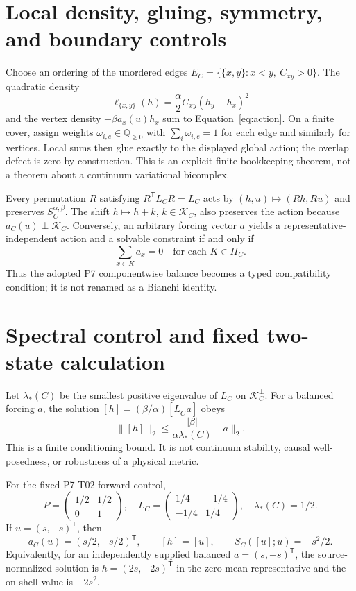 \documentclass[11pt]{article}
\newcommand{\Q}{\mathbb Q}
\newcommand{\Kspace}{\mathcal K_C}
\newcommand{\Sclosure}{S_C}
\begin{document}
\section{Local density, gluing, symmetry, and boundary controls}

Choose an ordering of the unordered edges
\(E_C=\{\{x,y\}:x<y,\ C_{xy}>0\}\).  The quadratic density
\[
  \ell_{\{x,y\}}(h)=\frac{\alpha}{2}C_{xy}(h_y-h_x)^2
\]
and the vertex density \(-\beta a_x(u)h_x\) sum to
Equation~\eqref{eq:action}.  On a finite cover, assign weights
\(\omega_{i,e}\in\Q_{\geq0}\) with \(\sum_i\omega_{i,e}=1\) for each edge
and similarly for vertices.  Local sums then glue exactly to the displayed
global action; the overlap defect is zero by construction.  This is an
explicit finite bookkeeping theorem, not a theorem about a continuum
variational bicomplex.

Every permutation \(R\) satisfying \(R^{\mathsf T}L_CR=L_C\) acts by
\((h,u)\mapsto(Rh,Ru)\) and preserves \(\Sclosure^{\alpha,\beta}\).
The shift \(h\mapsto h+k\), \(k\in\Kspace\), also preserves the action
because \(a_C(u)\perp\Kspace\).  Conversely, an arbitrary forcing vector
\(a\) yields a representative-independent action and a solvable constraint
if and only if
\[
  \sum_{x\in K}a_x=0
  \quad\text{for each }K\in\Pi_C.
\]
Thus the adopted P7 componentwise balance becomes a typed compatibility
condition; it is not renamed as a Bianchi identity.

\section{Spectral control and fixed two-state calculation}

Let \(\lambda_*(C)\) be the smallest positive eigenvalue of \(L_C\) on
\(\Kspace^\perp\).  For a balanced forcing \(a\), the solution
\([h]=(\beta/\alpha)[L_C^+a]\) obeys
\begin{equation}
 \|[h]\|_2
 \leq
 \frac{|\beta|}{\alpha\lambda_*(C)}\|a\|_2.
 \label{eq:gap-bound}
\end{equation}
This is a finite conditioning bound.  It is not continuum stability,
causal well-posedness, or robustness of a physical metric.

For the fixed P7-T02 forward control,
\[
 P=
 \begin{pmatrix}1/2&1/2\\0&1\end{pmatrix},
 \quad
 L_C=
 \begin{pmatrix}1/4&-1/4\\-1/4&1/4\end{pmatrix},
 \quad
 \lambda_*(C)=1/2.
\]
If \(u=(s,-s)^{\mathsf T}\), then
\[
 a_C(u)=(s/2,-s/2)^{\mathsf T},\qquad
 [h]=[u],\qquad
 \Sclosure([u];u)=-s^2/2.
\]
Equivalently, for an independently supplied balanced
\(a=(s,-s)^{\mathsf T}\), the source-normalized solution is
\(h=(2s,-2s)^{\mathsf T}\) in the zero-mean representative and the on-shell
value is \(-2s^2\).
\end{document}
